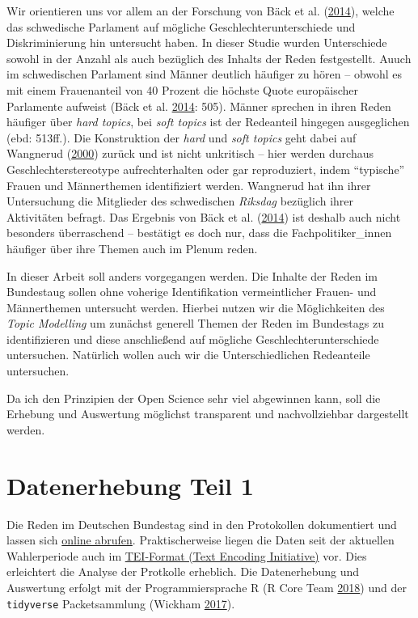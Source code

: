 \documentclass[oneside, 12pt]{scrbook}
\theoremstyle{definition}
\theoremstyle{definition}
\theoremstyle{definition}
\theoremstyle{remark}
\begin{document}
Wir orientieren uns vor allem an der Forschung von Bäck et al.
(\protect\hyperlink{ref-back_2014}{2014}), welche das schwedische
Parlament auf mögliche Geschlechterunterschiede und Diskriminierung hin
untersucht haben. In dieser Studie wurden Unterschiede sowohl in der
Anzahl als auch bezüglich des Inhalts der Reden festgestellt. Auuch im
schwedischen Parlament sind Männer deutlich häufiger zu hören -- obwohl
es mit einem Frauenanteil von 40 Prozent die höchste Quote europäischer
Parlamente aufweist (Bäck et al.
\protect\hyperlink{ref-back_2014}{2014}: 505). Männer sprechen in ihren
Reden häufiger über \emph{hard topics}, bei \emph{soft topics} ist der
Redeanteil hingegen ausgeglichen (ebd: 513ff.). Die Konstruktion der
\emph{hard} und \emph{soft topics} geht dabei auf Wangnerud
(\protect\hyperlink{ref-wangnerud_2000}{2000}) zurück und ist nicht
unkritisch -- hier werden durchaus Geschlechterstereotype
aufrechterhalten oder gar reproduziert, indem ``typische'' Frauen und
Männerthemen identifiziert werden. Wangnerud hat ihn ihrer Untersuchung
die Mitglieder des schwedischen \emph{Riksdag} bezüglich ihrer
Aktivitäten befragt. Das Ergebnis von Bäck et al.
(\protect\hyperlink{ref-back_2014}{2014}) ist deshalb auch nicht
besonders überraschend -- bestätigt es doch nur, dass die
Fachpolitiker\_innen häufiger über ihre Themen auch im Plenum reden.

In dieser Arbeit soll anders vorgegangen werden. Die Inhalte der Reden
im Bundestaug sollen ohne voherige Identifikation vermeintlicher Frauen-
und Männerthemen untersucht werden. Hierbei nutzen wir die Möglichkeiten
des \emph{Topic Modelling} um zunächst generell Themen der Reden im
Bundestags zu identifizieren und diese anschließend auf mögliche
Geschlechterunterschiede untersuchen. Natürlich wollen auch wir die
Unterschiedlichen Redeanteile untersuchen.

Da ich den Prinzipien der Open Science sehr viel abgewinnen kann, soll
die Erhebung und Auswertung möglichst transparent und nachvollziehbar
dargestellt werden.

\hypertarget{data-01}{%
\chapter{Datenerhebung Teil 1}\label{data-01}}

Die Reden im Deutschen Bundestag sind in den Protokollen dokumentiert
und lassen sich \href{https://www.bundestag.de/protokolle}{online
abrufen}. Praktischerweise liegen die Daten seit der aktuellen
Wahlerperiode auch im \href{http://www.tei-c.org/}{TEI-Format (Text
Encoding Initiative)} vor. Dies erleichtert die Analyse der Protkolle
erheblich. Die Datenerhebung und Auswertung erfolgt mit der
Programmiersprache R (R Core Team
\protect\hyperlink{ref-rcoreteam_2018}{2018}) und der \texttt{tidyverse}
Packetsammlung (Wickham \protect\hyperlink{ref-wickham_2017}{2017}).
\end{document}
